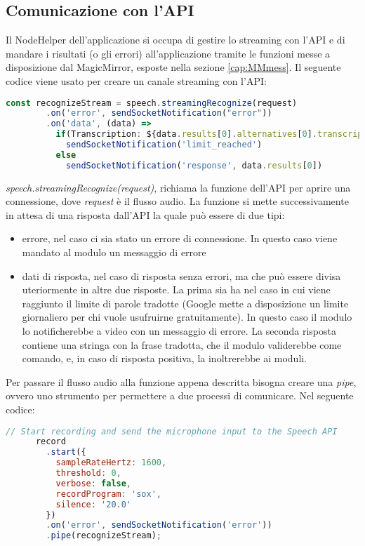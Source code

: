 \subsection{Comunicazione con l'API}\label{cap:api}
Il NodeHelper dell'applicazione si occupa di gestire lo streaming con l'API e
di mandare i risultati (o gli errori) all'applicazione tramite le funzioni messe
a disposizione dal MagicMirror, esposte nella sezione \ref{cap:MMmess}.
Il seguente codice viene usato per creare un canale streaming con l'API:
\begin{lstlisting}[language=Javascript, caption={Codice per l'inoltro dell'audio al Servizio Google}, captionpos=b]
      const recognizeStream = speech.streamingRecognize(request)
        .on('error', sendSocketNotification("error"))
        .on('data', (data) =>
          if(Transcription: ${data.results[0].alternatives[0].transcript})
            sendSocketNotification('limit_reached')
          else
            sendSocketNotification('response', data.results[0])
\end{lstlisting}
\emph{speech.streamingRecognize(request)}, richiama la funzione dell'API per aprire una connessione, dove \emph{request} \`e
il flusso audio.
La funzione si mette successivamente in attesa di una risposta dall'API la quale pu\`o essere di due tipi:
\begin{itemize}
\item errore, nel caso ci sia stato un errore di connessione. In questo caso viene mandato al modulo un messaggio di errore
\item dati di risposta, nel caso di risposta senza errori, ma che pu\`o essere divisa uteriormente in altre due risposte. La prima sia ha nel caso in cui
viene raggiunto il limite di parole tradotte (Google mette a disposizione un limite giornaliero per chi vuole usufruirne gratuitamente). In questo caso
il modulo lo notificherebbe a video con un messaggio di errore. La seconda risposta contiene una stringa con la frase tradotta,
che il modulo validerebbe come comando,
e, in caso di risposta positiva, la inoltrerebbe ai moduli.\\[1\baselineskip]
\end{itemize}
Per passare il flusso audio alla funzione appena descritta bisogna creare una \emph{pipe}, ovvero uno strumento
per permettere a due processi di comunicare.
Nel seguente codice:
\begin{lstlisting}[language=Javascript]
      // Start recording and send the microphone input to the Speech API
      record
        .start({
          sampleRateHertz: 1600,
          threshold: 0,
          verbose: false,
          recordProgram: 'sox',
          silence: '20.0'
        })
        .on('error', sendSocketNotification('error'))
        .pipe(recognizeStream);
\end{lstlisting}
